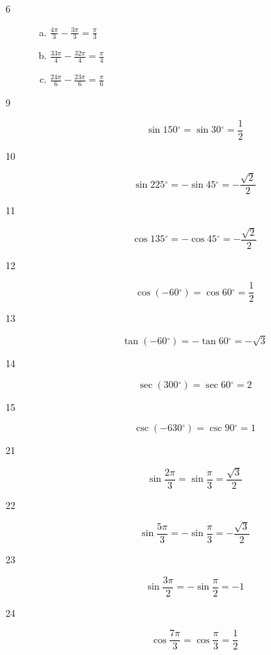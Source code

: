 \documentclass{exam}
\newcommand{\dg}{\ensuremath{^\circ}}
\begin{document}
\begin{description}
      \item[6] 
        \begin{enumerate}[(a)]
          \item $\frac{4 \pi}{3} - \frac{3 \pi}{3} = \boxed{ \frac{\pi}{3} }$
          \item $\frac{33 \pi}{4} - \frac{32 \pi}{4} = \boxed{ \frac{\pi}{4} }$
          \item $\frac{24 \pi}{6} - \frac{23 \pi}{6} = \boxed{ \frac{\pi}{6} }$
        \end{enumerate}

      \item[9]
        \[
          \sin 150 \dg = \sin 30 \dg = \boxed{ \frac{1}{2} }
        \]

      \item[10]
        \[
          \sin 225 \dg = - \sin 45 \dg = \boxed{ - \frac{\sqrt{2}}{2} }
        \]

      \item[11]
        \[
          \cos 135 \dg = - \cos 45 \dg = \boxed{ - \frac{\sqrt{2}}{2} }
        \]

      \item[12]
        \[
          \cos (-60 \dg) = \cos 60 \dg = \boxed{ \frac{1}{2} }
        \]

      \item[13]
        \[
          \tan (-60 \dg) = - \tan 60 \dg = \boxed{ - \sqrt{3} }
        \]

      \item[14]
        \[
          \sec (300 \dg) = \sec 60 \dg = \boxed{ 2 }
        \]

      \item[15]
        \[
          \csc (-630 \dg) = \csc 90 \dg = \boxed{ 1 }
        \]

      \item[21]
        \[
          \sin \frac{2 \pi}{3} = \sin \frac{\pi}{3} = \boxed{ \frac{\sqrt{3}}{2} }
        \]

      \item[22]
        \[
          \sin \frac{5 \pi}{3} = - \sin \frac{\pi}{3} = \boxed{ - \frac{\sqrt{3}}{2} }
        \]

      \item[23]
        \[
          \sin \frac{3 \pi}{2} = - \sin \frac{\pi}{2} = \boxed{ - 1 }
        \]

      \item[24]
        \[
          \cos \frac{7 \pi}{3} = \cos \frac{\pi}{3} = \boxed{ \frac{1}{2} }
        \]


\end{description}
\end{document}
